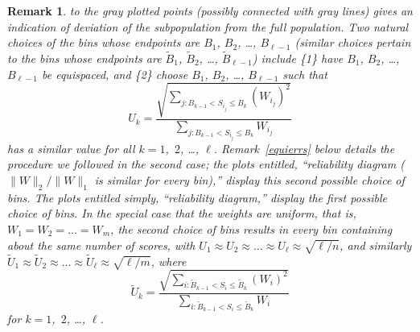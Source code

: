 \documentclass{article}
\newtheorem{remark1}[theorem]{Remark}
\newenvironment{remark}{\begin{remark1} \rm}{\end{remark1}}
\begin{document}
\begin{remark}
to the gray plotted points (possibly connected with gray lines)
gives an indication of deviation of the subpopulation from the full population.
Two natural choices of the bins whose endpoints are
$B_1$, $B_2$, \dots, $B_{\ell-1}$ (similar choices pertain to the bins
whose endpoints are $\tilde{B}_1$, $\tilde{B}_2$, \dots, $\tilde{B}_{\ell-1}$)
include \{1\} have $B_1$, $B_2$, \dots, $B_{\ell-1}$ be equispaced, and
\{2\} choose $B_1$, $B_2$, \dots, $B_{\ell-1}$ such that
%
\begin{equation}
\label{subpopulationnorms}
U_k = \frac{\sqrt{\sum_{j : B_{k-1} < S_{i_j} \le B_k} (W_{i_j})^2}}
           {\sum_{j : B_{k-1} < S_{i_j} \le B_k} W_{i_j}}
\end{equation}
%
has a similar value for all $k = 1$,~$2$, \dots, $\ell$.
Remark~\ref{equierrs} below details the procedure we followed
in the second case; the plots entitled,
``reliability diagram ($\|W\|_2 / \|W\|_1$ is similar for every bin),''
display this second possible choice of bins.
The plots entitled simply, ``reliability diagram,''
display the first possible choice of bins.
In the special case that the weights are uniform, that is,
$W_1 = W_2 = \dots = W_m$, the second choice of bins results
in every bin containing about the same number of scores,
with $U_1 \approx U_2 \approx \dots \approx U_{\ell} \approx \sqrt{\ell/n}$,
and similarly $\tilde{U}_1 \approx \tilde{U}_2 \approx \dots
\approx \tilde{U}_{\ell} \approx \sqrt{\ell/m}$, where
%
\begin{equation}
\label{fullnorms}
\tilde{U}_k
= \frac{\sqrt{\sum_{i : \tilde{B}_{k-1} < S_i \le \tilde{B}_k} (W_i)^2}}
       {\sum_{i : \tilde{B}_{k-1} < S_i \le \tilde{B}_k} W_i}
\end{equation}
%
for $k = 1$,~$2$, \dots, $\ell$.
\end{remark}
\end{document}
